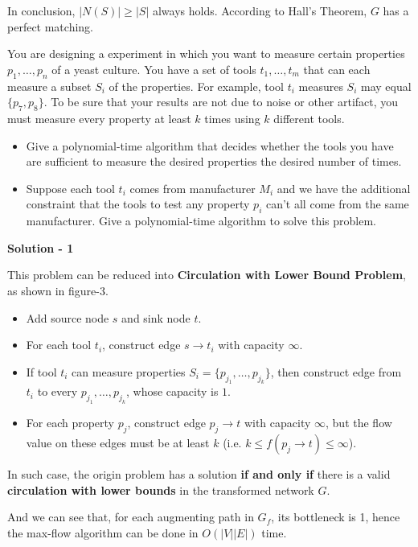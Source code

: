 \documentclass{article}
\newcounter{exercise}
\newcommand{\<}{
    \langle}
\renewcommand{\>}{
    \rangle}
\begin{document}
{In conclusion, $|N(S)| \ge |S|$ always holds. According to Hall's Theorem, $G$ has a perfect matching.


\begin{exercise}
You are designing a experiment in which you want to measure certain properties $p_1,\ldots ,p_n$ of a yeast culture. You have a set of tools $t_1,\ldots ,t_m$ that can each measure a subset $S_i$ of the properties. For example, tool $t_i$ measures $S_i$ may equal $\{p_7,p_8\}$. To be sure that your results are not due to noise or other artifact, you must measure every property at least $k$ times using $k$ different tools.
\begin{itemize}
\item Give a polynomial-time algorithm that decides whether the tools you have are sufficient to measure the desired properties the desired number of times.
\item Suppose each tool $t_i$ comes from manufacturer $M_i$ and we have the additional constraint that the tools to test any property $p_i$ can't all come from the same manufacturer. Give a polynomial-time algorithm to solve this problem.
\end{itemize}
\end{exercise}

\bigskip \noindent \textbf{Solution - 1} \bigskip

This problem can be reduced into \textbf{Circulation with Lower Bound Problem}, as shown in figure-3.

\begin{itemize}
    \item Add source node $s$ and sink node $t$.
    \item For each tool $t_i$, construct edge $s \rightarrow t_i$ with capacity $\infty$.
    \item If tool $t_i$ can measure properties $S_i = \{p_{j_1}, \dots, p_{j_k}\}$, then construct edge from $t_i$ to every $p_{j_1}, \dots, p_{j_k}$, whose capacity is $1$.
    \item For each property $p_j$, construct edge $p_j \rightarrow t$ with capacity $\infty$, but the flow value on these edges must be at least $k$ (i.e. $k \le f(p_j \rightarrow t) \le \infty$).
\end{itemize}

In such case, the origin problem has a solution \textbf{if and only if} there is a valid \textbf{circulation with lower bounds} in the transformed network $G$.

And we can see that, for each augmenting path in $G_f$, its bottleneck is 1, hence the max-flow algorithm can be done in $O(|V||E|)$ time.

}
\end{document}
